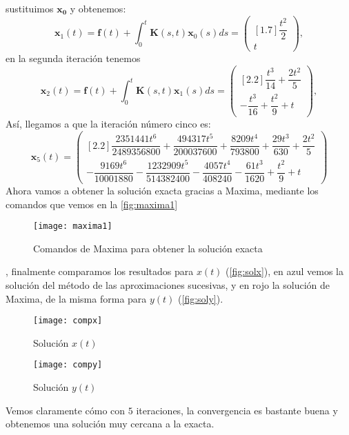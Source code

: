 \begin{ejemplo}
\begin{equation}
	\end{equation}
	sustituimos $\textbf{x}_\textbf{0}$ y obtenemos:
	\begin{equation}
		\textbf{x}_{1}(t) = \textbf{f}(t) + \int_0^t \textbf{K}(s,t)\textbf{x}_0(s)ds = \begin{pmatrix}[1.7]	\dfrac{t^2}{2} \\ t 	\end{pmatrix},
	\end{equation}
	en la segunda iteración tenemos
	\begin{equation}
		\textbf{x}_{2}(t) = \textbf{f}(t) + \int_0^t \textbf{K}(s,t)\textbf{x}_1(s)ds = \begin{pmatrix}[2.2] \dfrac{t^3}{14}+\dfrac{2t^2}{5}\\ -\dfrac{t^3}{16}+\dfrac{t^2}{9}+t	\end{pmatrix},
	\end{equation}
	Así, llegamos a que la iteración número cinco es:
	\begin{equation}
		\textbf{x}_5(t) = \begin{pmatrix}[2.2]
			\dfrac{2351441t^6}{2489356800}+\dfrac{494317t^5}{200037600}+\dfrac{8209t^4}{793800}+\dfrac{29t^3}{630}+\dfrac{2t^2}{5}   \\ -\dfrac{9169t^6}{10001880}-\dfrac{1232909t^5}{514382400}-\dfrac{4057t^4}{408240}-\dfrac{61t^3}{1620}+\dfrac{t^2}{9}+t
		\end{pmatrix}
	\end{equation}
	Ahora vamos a obtener la solución exacta gracias a Maxima, mediante los comandos que vemos en la \autoref{fig:maxima1}
	\begin{figure}[h!]
		\centering
		\texttt{[image: maxima1]}
		\caption{Comandos de Maxima para obtener la solución exacta}
		\label{fig:maxima1}
	\end{figure}
	, finalmente comparamos los resultados para $x(t)$ (\autoref{fig:solx}), en azul vemos la solución del método de las aproximaciones sucesivas, y en rojo la solución de Maxima, de la misma forma para $y(t)$ (\autoref{fig:soly}).
	\begin{figure}[h!]
		\centering
		\texttt{[image: compx]}
		\caption{Solución $x(t)$}
		\label{fig:solx}
	\end{figure}
	\begin{figure}[h!]
		\centering
		\texttt{[image: compy]}
		\caption{Solución $y(t)$}
		\label{fig:soly}
	\end{figure}
	Vemos claramente cómo con $5$ iteraciones, la convergencia es bastante buena y obtenemos una solución muy cercana a la exacta.
\end{ejemplo}
\endinput
-